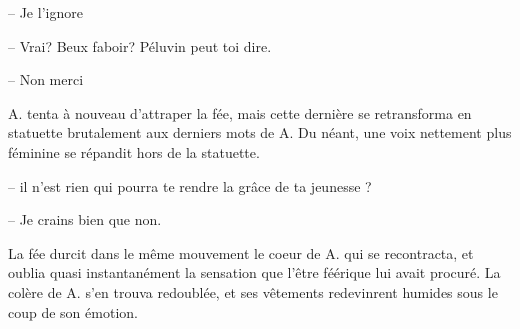 -- Je l'ignore

-- Vrai? Beux faboir? Péluvin peut toi dire.

-- Non merci

A. tenta à nouveau d'attraper la fée, mais cette dernière se
retransforma en statuette brutalement aux derniers mots de A. Du
néant, une voix nettement plus féminine se répandit hors de la
statuette.

-- il n'est rien qui pourra te rendre la grâce de ta jeunesse ?

-- Je crains bien que non.

La fée durcit dans le même mouvement le coeur de A. qui se
recontracta, et oublia quasi instantanément la sensation que l'être
féérique lui avait procuré. La colère de A. s'en trouva redoublée, et
ses vêtements redevinrent humides sous le coup de son émotion.

